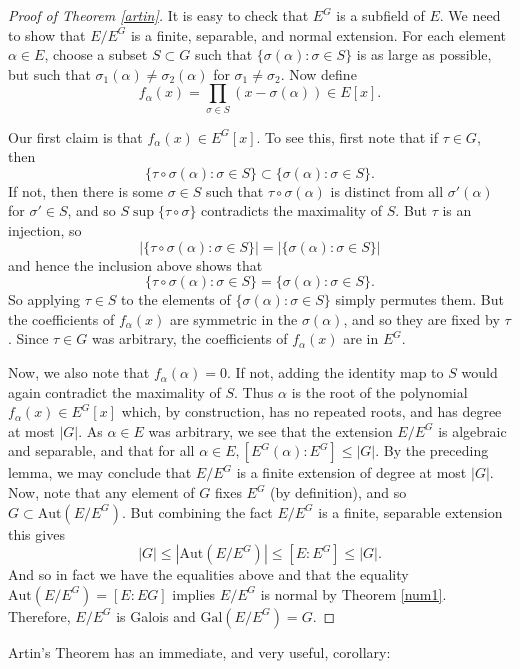 \documentclass[12pt]{report}
\theoremstyle{definition}
\newcommand{\Aut}{\text{Aut}}
\newcommand{\Gal}{\text{Gal}}
\begin{document}
\begin{proof}[Proof of Theorem \ref{artin}]
	It is easy to check that $E^G$ is a subfield of $E$. We need to show that $E/E^G$ is a finite, separable, and normal extension. For each element $\alpha \in E$, choose a subset $S \subset G$ such that $\{\sigma(\alpha): \sigma\in S\}$ is as large as possible, but such that $\sigma_1(\alpha) \not= \sigma_2(\alpha)$ for $\sigma_1\not=\sigma_2$.
	Now define $$f_\alpha(x) =\prod_{\sigma\in S}(x-\sigma(\alpha)) \in E[x].$$

	Our first claim is that $f_\alpha(x) \in E^G[x]$.
	To see this, first note that if $\tau \in G$, then
	$$\{\tau\circ\sigma(\alpha):\sigma\in S\}\subset \{\sigma(\alpha): \sigma\in S\}.$$
	If not, then there is some $\sigma \in S$ such that $\tau \circ \sigma(\alpha)$ is distinct from all $\sigma'(\alpha)$ for $\sigma' \in S$, and so $S\sup \{ \tau\circ \sigma \}$ contradicts the maximality of $S$. But $\tau$ is an injection, so $$|\{\tau\circ\sigma(\alpha):\sigma\in S\}|=|\{\sigma(\alpha): \sigma\in S\}|$$ and hence the inclusion above shows that $$\{\tau\circ\sigma(\alpha):\sigma\in S\} = \{\sigma(\alpha): \sigma\in S\}.$$
	So applying $\tau \in S$ to the elements of $\{\sigma(\alpha): \sigma\in S\}$ simply permutes them. But the coefficients of $f_\alpha(x)$ are symmetric in the $\sigma(\alpha)$, and so they are fixed by $\tau$. Since $\tau \in G$ was arbitrary, the coefficients of $f_\alpha(x)$ are in $E^G$.

	Now, we also note that $f_\alpha(\alpha) = 0$. If not, adding the identity map to $S$ would again contradict the maximality of $S$. Thus $\alpha$ is the root of the polynomial $f_\alpha(x) \in E^G[x]$ which, by construction, has no repeated roots, and has degree at most $|G|$. As $\alpha \in E$ was arbitrary, we see that the extension $E/E^G$ is algebraic and separable, and that for all $\alpha \in E, [E^G(\alpha) : E^G] \leq |G|$. By the preceding lemma, we may conclude that $E/E^G$ is a finite extension of degree at most $|G|$. Now, note that any element of $G$ fixes $E^G$ (by definition), and so $G \subset \Aut(E/E^G)$. But combining the fact $E/E^G$ is a finite, separable extension this gives $$|G| \leq |\Aut(E/E^G)| \leq [E:E^G] \leq |G|.$$
	And so in fact we have the equalities above and that the equality $\Aut(E/E^G) = [E : EG]$ implies $E/E^G$ is normal by Theorem \ref{num1}. Therefore, $E/E^G$ is Galois and $\Gal(E/E^G) = G$.
\end{proof}

Artin's Theorem has an immediate, and very useful, corollary:
\end{document}
